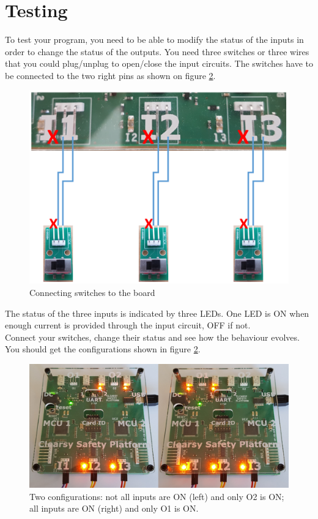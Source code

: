 \section{Testing}

To test your program, you need to be able to modify the status of the inputs in order to change the status of the outputs. You need three switches or three wires that you could plug/unplug to open/close the input circuits. The switches have to be connected to the two right pins as shown on figure \ref{projects:Combinatorial_1-connecting}.
\begin{figure}[h]
\centering\includegraphics[scale=0.25]{Pictures/chaptProjects/combinatorial-montage.png}
\caption{Connecting switches to the board}
\label{projects:Combinatorial_1-connecting}
\end{figure}
The status of the three inputs is indicated by three LEDs. One LED is ON when enough current is provided through the input circuit, OFF if not. \\
Connect your switches, change their status and see how the behaviour evolves. You should get the configurations shown in figure \ref{projects:Combinatorial_1-connecting}.
\begin{figure}[h]
\centering\includegraphics[scale=0.5]{Pictures/chaptProjects/comb1_join.png}
\caption{Two configurations: not all inputs are ON (left) and only O2 is ON; all inputs are ON (right) and only O1 is ON.}
\label{projects:Combinatorial_1-connecting}
\end{figure}

